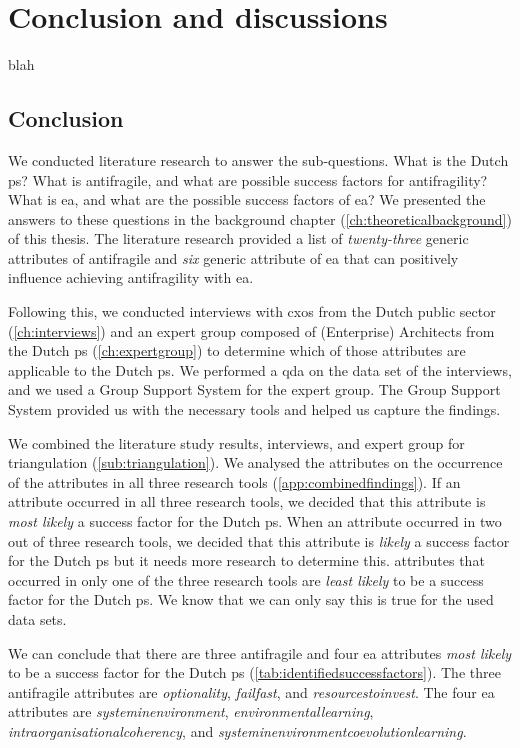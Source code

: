 \chapter{Conclusion and discussions}
\label{ch:conclusionanddiscussions}
blah
\section{Conclusion}
\label{sec:conclusion}
We conducted literature research to answer the sub-questions. What is the Dutch \gls{ps}? What is \gls{antifragile}, and what are possible success factors for \gls{antifragility}? What is \acrlong{ea}, and what are the possible success factors of \acrlong{ea}? We presented the answers to these questions in the background chapter (\cref{ch:theoreticalbackground}) of this thesis. The literature research provided a list of \textit{twenty-three} generic \glspl{attribute} of \gls{antifragile} and \textit{six} generic \gls{attribute} of \acrlong{ea} that can positively influence achieving \gls{antifragility} with \acrlong{ea}.

Following this, we conducted interviews with \glspl{cxo} from the Dutch public sector (\cref{ch:interviews}) and an expert group composed of (Enterprise) Architects from the Dutch \gls{ps} (\cref{ch:expertgroup}) to determine which of those \glspl{attribute} are applicable to the Dutch \gls{ps}. We performed a \acrlong{qda} on the data set of the interviews, and we used a Group Support System for the expert group. The Group Support System provided us with the necessary tools and helped us capture the findings. 

We combined the literature study results, interviews, and expert group for \gls{triangulation} (\cref{sub:triangulation}). We analysed the \glspl{attribute} on the occurrence of the \glspl{attribute} in all three research tools (\cref{app:combinedfindings}). If an \gls{attribute} occurred in all three research tools, we decided that this \gls{attribute} is \textit{most likely} a success factor for the Dutch \gls{ps}. When an \gls{attribute} occurred in two out of three research tools, we decided that this \gls{attribute} is \textit{likely} a success factor for the Dutch \gls{ps} but it needs more research to determine this. \Glspl{attribute} that occurred in only one of the three research tools are \textit{least likely} to be a success factor for the Dutch \gls{ps}. We know that we can only say this is true for the used data sets.

We can conclude that there are three \gls{antifragile} and four \acrlong{ea} \glspl{attribute} \textit{most likely} to be a success factor for the Dutch \gls{ps} (\cref{tab:identifiedsuccessfactors}). The three \gls{antifragile} \glspl{attribute} are \textit{\gls{optionality}}, \textit{\gls{failfast}}, and \textit{\gls{resourcestoinvest}}. The four \acrlong{ea} \glspl{attribute} are \textit{\gls{systeminenvironment}}, \textit{\gls{environmentallearning}}, \textit{\gls{intraorganisationalcoherency}}, and \textit{\gls{systeminenvironmentcoevolutionlearning}}.

